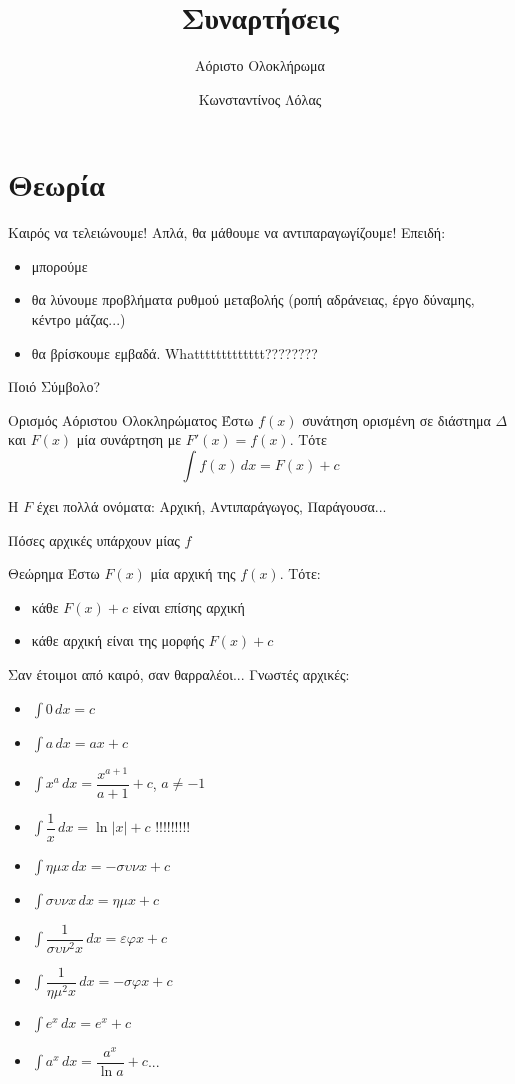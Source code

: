\documentclass{../presentation}
\title{Συναρτήσεις}
\subtitle{Αόριστο Ολοκλήρωμα}
\author[Λόλας]{Κωνσταντίνος Λόλας}
\institute[$10^ο$ ΓΕΛ]{$10^ο$ ΓΕΛ Θεσσαλονίκης}
\date{}
\begin{document}
\begin{frame}
  \titlepage
\end{frame}

\section{Θεωρία}
\begin{frame}{Καιρός να τελειώνουμε!}
  Απλά, θα μάθουμε να αντιπαραγωγίζουμε! Επειδή:
  \begin{itemize}[<+->]
    \item μπορούμε
    \item θα λύνουμε προβλήματα ρυθμού μεταβολής (ροπή αδράνειας, έργο δύναμης, κέντρο μάζας...)
    \item θα βρίσκουμε εμβαδά. Whattttttttttttt????????
  \end{itemize}
\end{frame}

\begin{frame}{Ποιό Σύμβολο?}
  \begin{block}{Ορισμός Αόριστου Ολοκληρώματος}
    Έστω $f(x)$ συνάτηση ορισμένη σε διάστημα $Δ$ και $F(x)$ μία συνάρτηση με $F'(x)=f(x)$. Τότε
    $$\int f(x) \, dx=F(x)+c$$
  \end{block}
  H $F$ έχει πολλά ονόματα: Αρχική, Αντιπαράγωγος, Παράγουσα...
\end{frame}

\begin{frame}{Πόσες αρχικές υπάρχουν μίας $f$}
  \begin{block}{Θεώρημα}
    Έστω $F(x)$ μία αρχική της $f(x)$. Τότε:
    \begin{itemize}
      \item κάθε $F(x)+c$ είναι επίσης αρχική
      \item κάθε αρχική είναι της μορφής $F(x)+c$
    \end{itemize}
  \end{block}
\end{frame}

\begin{frame}{Σαν έτοιμοι από καιρό, σαν θαρραλέοι...}
  Γνωστές αρχικές:
  \begin{multicols}{2}
    \begin{itemize}[<+->]
      \item $\int 0 \, dx=c$
      \item $\int a \, dx=ax+c$
      \item $\int x^a \, dx=\dfrac{x^{a+1}}{a+1}+c$, $a\ne -1$
      \item $\int \dfrac{1}{x} \, dx=\ln|x|+c$ !!!!!!!!!
      \item $\int ημx \, dx=-συνx+c$
      \item $\int συνx \, dx=ημx+c$
      \item $\int \dfrac{1}{συν^2x} \, dx=εφx+c$
      \item $\int \dfrac{1}{ημ^2x} \, dx=-σφx+c$
      \item $\int e^x \, dx=e^x+c$
      \item $\int a^x \, dx=\dfrac{a^x}{\ln a}+c$...
    \end{itemize}
  \end{multicols}
\end{frame}
\end{document}
